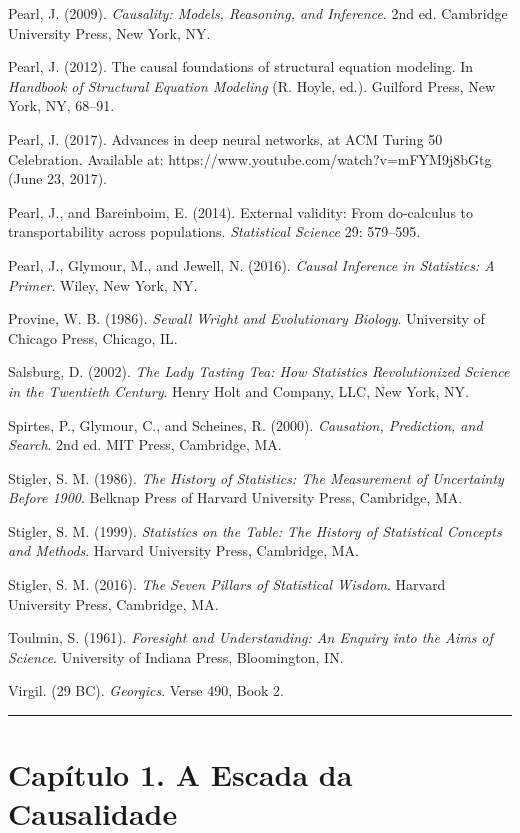 \documentclass[11pt,a5paper,twoside]{book}
\begin{document}
Pearl, J. (2009). \textit{Causality: Models, Reasoning, and Inference}. 2nd ed. Cambridge University Press, New York, NY.

Pearl, J. (2012). The causal foundations of structural equation modeling. In \textit{Handbook of Structural Equation Modeling} (R. Hoyle, ed.). Guilford Press, New York, NY, 68–91.

Pearl, J. (2017). Advances in deep neural networks, at ACM Turing 50 Celebration. Available at: https://www.youtube.com/watch?v=mFYM9j8bGtg (June 23, 2017).

Pearl, J., and Bareinboim, E. (2014). External validity: From do-calculus to transportability across populations. \textit{Statistical Science} 29: 579–595.

Pearl, J., Glymour, M., and Jewell, N. (2016). \textit{Causal Inference in Statistics: A Primer}. Wiley, New York, NY.

Provine, W. B. (1986). \textit{Sewall Wright and Evolutionary Biology}. University of Chicago Press, Chicago, IL.

Salsburg, D. (2002). \textit{The Lady Tasting Tea: How Statistics Revolutionized Science in the Twentieth Century}. Henry Holt and Company, LLC, New York, NY.

Spirtes, P., Glymour, C., and Scheines, R. (2000). \textit{Causation, Prediction, and Search}. 2nd ed. MIT Press, Cambridge, MA.

Stigler, S. M. (1986). \textit{The History of Statistics: The Measurement of Uncertainty Before 1900}. Belknap Press of Harvard University Press, Cambridge, MA.

Stigler, S. M. (1999). \textit{Statistics on the Table: The History of Statistical Concepts and Methods}. Harvard University Press, Cambridge, MA.

Stigler, S. M. (2016). \textit{The Seven Pillars of Statistical Wisdom}. Harvard University Press, Cambridge, MA.

Toulmin, S. (1961). \textit{Foresight and Understanding: An Enquiry into the Aims of Science}. University of Indiana Press, Bloomington, IN.

Virgil. (29 BC). \textit{Georgics}. Verse 490, Book 2.

\vspace{1em}\hrule\vspace{1em}
\section{Capítulo 1. A Escada da Causalidade}
\end{document}
